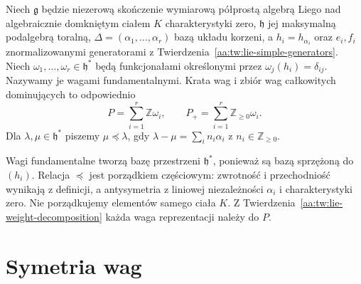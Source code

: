 \begin{definicja}
\label{aa:def:lie-dominant-integral}
Niech $\mathfrak g$ będzie niezerową skończenie wymiarową półprostą algebrą Liego nad algebraicznie domkniętym ciałem $K$ charakterystyki zero, $\mathfrak h$ jej maksymalną podalgebrą toralną, $\Delta=(\alpha_1,\ldots,\alpha_r)$ bazą układu korzeni, a $h_i=h_{\alpha_i}$ oraz $e_i,f_i$ znormalizowanymi generatorami z Twierdzenia~\ref{aa:tw:lie-simple-generators}. Niech $\omega_1,\ldots,\omega_r\in\mathfrak h^*$ będą funkcjonałami określonymi przez $\omega_j(h_i)=\delta_{ij}$. Nazywamy je wagami fundamentalnymi. Krata wag i zbiór wag całkowitych dominujących to odpowiednio
\[
 P=\sum_{i=1}^r\mathbb Z\omega_i,\qquad
 P_+=\sum_{i=1}^r\mathbb Z_{\ge0}\omega_i.
\]
Dla $\lambda,\mu\in\mathfrak h^*$ piszemy $\mu\preceq\lambda$, gdy
$\lambda-\mu=\sum_i n_i\alpha_i$ z $n_i\in\mathbb Z_{\ge0}$.
\end{definicja}

Wagi fundamentalne tworzą bazę przestrzeni $\mathfrak h^*$, ponieważ są bazą sprzężoną do $(h_i)$. Relacja $\preceq$ jest porządkiem częściowym: zwrotność i przechodniość wynikają z definicji, a antysymetria z liniowej niezależności $\alpha_i$ i charakterystyki zero. Nie porządkujemy elementów samego ciała $K$. Z Twierdzenia~\ref{aa:tw:lie-weight-decomposition} każda waga reprezentacji należy do $P$.

\section{Symetria wag}

